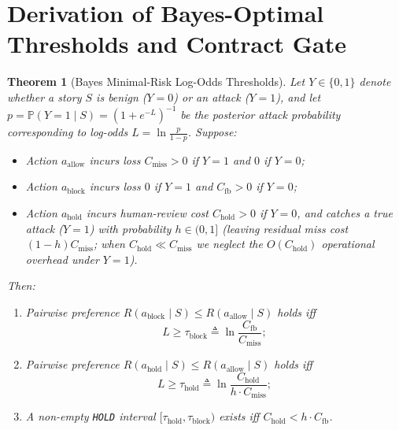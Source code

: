 \documentclass[10pt,twocolumn,letterpaper]{article}
\makeatletter
\theoremstyle{plain}
\newtheorem{theorem}{Theorem}[section]
\theoremstyle{definition}
\theoremstyle{remark}
\DeclareRobustCommand{\_}{\ifmmode\nfss@text{\textunderscore}\else\textunderscore\penalty\@highpenalty\hskip\z@skip\fi}
\makeatother
\begin{document}
\section{Derivation of Bayes-Optimal Thresholds and Contract Gate}
\label{app:bayes}

\begin{theorem}[Bayes Minimal-Risk Log-Odds Thresholds]
\label{thm:bayes_thresholds}
Let $Y \in \{0, 1\}$ denote whether a story $S$ is benign ($Y=0$) or an attack ($Y=1$), and let $p = \mathbb{P}(Y = 1 \mid S) = (1 + e^{-L})^{-1}$ be the posterior attack probability corresponding to log-odds $L = \ln\frac{p}{1-p}$. Suppose:
\begin{itemize}[leftmargin=1.4em,itemsep=1pt,topsep=2pt]
  \item Action $a_{\text{allow}}$ incurs loss $C_{\text{miss}} > 0$ if $Y=1$ and $0$ if $Y=0$;
  \item Action $a_{\text{block}}$ incurs loss $0$ if $Y=1$ and $C_{\text{fb}} > 0$ if $Y=0$;
  \item Action $a_{\text{hold}}$ incurs human-review cost $C_{\text{hold}} > 0$ if $Y=0$, and catches a true attack ($Y=1$) with probability $h \in (0, 1]$ (leaving residual miss cost $(1 - h)C_{\text{miss}}$; when $C_{\text{hold}} \ll C_{\text{miss}}$ we neglect the $O(C_{\text{hold}})$ operational overhead under $Y=1$).
\end{itemize}
Then:
\begin{enumerate}[leftmargin=1.5em,itemsep=1.5pt,topsep=2pt]
  \item Pairwise preference $R(a_{\text{block}} \mid S) \le R(a_{\text{allow}} \mid S)$ holds iff
  \[
    L \ge \tau_{\text{block}} \triangleq \ln\frac{C_{\text{fb}}}{C_{\text{miss}}};
  \]
  \item Pairwise preference $R(a_{\text{hold}} \mid S) \le R(a_{\text{allow}} \mid S)$ holds iff
  \[
    L \ge \tau_{\text{hold}} \triangleq \ln\frac{C_{\text{hold}}}{h \cdot C_{\text{miss}}};
  \]
  \item A non-empty \texttt{HOLD} interval $[\tau_{\text{hold}}, \tau_{\text{block}})$ exists iff $C_{\text{hold}} < h \cdot C_{\text{fb}}$.
\end{enumerate}
\end{theorem}
\end{document}
